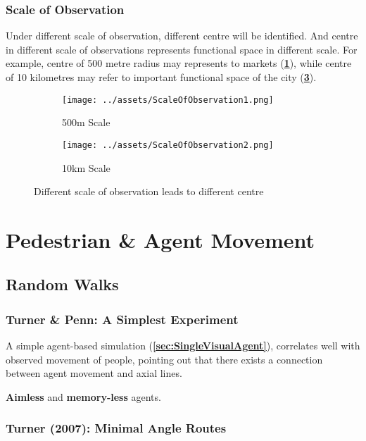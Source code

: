 \documentclass[a4paper, openany]{book}
\begin{document}
\subsubsection{Scale of Observation}

Under different scale of observation, different centre will be identified. And centre in different scale of observations represents functional space in different scale. For example, centre of 500 metre radius may represents to markets (\textbf{\cref{fig:ScaleOfObservation1}}), while centre of 10 kilometres may refer to important functional space of the city (\textbf{\cref{fig:ScaleOfObservation2}}).

\begin{figure}[htbp]
  \centering
  \begin{subfigure}{0.49\textwidth}
    \centering
    \texttt{[image: ../assets/ScaleOfObservation1.png]}
    \caption{500m Scale}
    \label{fig:ScaleOfObservation1}
  \end{subfigure}
  \begin{subfigure}{0.49\textwidth}
    \centering
    \texttt{[image: ../assets/ScaleOfObservation2.png]}
    \caption{10km Scale}
    \label{fig:ScaleOfObservation2}
  \end{subfigure}
  \caption{Different scale of observation leads to different centre}
\end{figure}

\section{Pedestrian \& Agent Movement}

\subsection{Random Walks}

\subsubsection{Turner \& Penn: A Simplest Experiment}

A simple agent-based simulation (\textbf{\cref{sec:SingleVisualAgent}}), correlates well with observed movement of people, pointing out that there exists a connection between agent movement and axial lines.

\textbf{Aimless} and \textbf{memory-less} agents.

\subsubsection{Turner (2007): Minimal Angle Routes}
\end{document}

